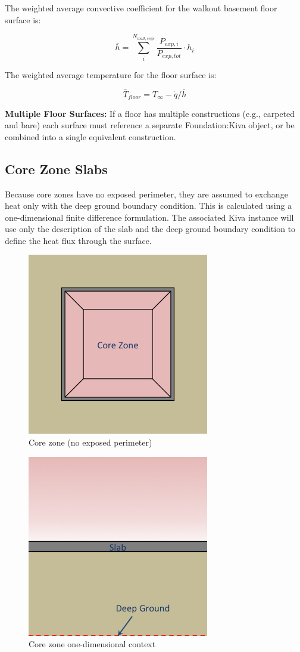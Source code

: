 The weighted average convective coefficient for the walkout basement
floor surface is:

\[\bar{h} = \sum^{N_{wall,segs}}_i{\frac{P_{exp,i}}{P_{exp,tot}}}\cdot h_i\]

The weighted average temperature for the floor surface is:

\[ \bar{T}_{floor} = T_\infty - \dot{q}/\bar{h} \]

\textbf{Multiple Floor Surfaces:} If a floor has multiple constructions
(e.g., carpeted and bare) each surface must reference a separate
Foundation:Kiva object, or be combined into a single equivalent
construction.

\subsection{Core Zone Slabs}

Because core zones have no exposed perimeter, they are assumed to
exchange heat only with the deep ground boundary condition. This is
calculated using a one-dimensional finite difference formulation. The
associated Kiva instance will use only the description of the slab and
the deep ground boundary condition to define the heat flux through the
surface.

\begin{figure}
\centering
\includegraphics{media/kiva-core-zone.png}
\caption{Core zone (no exposed perimeter)\label{fig:cz}}
\end{figure}

\begin{figure}
\centering
\includegraphics{media/kiva-core-zone-1d.png}
\caption{Core zone one-dimensional context\label{fig:cz-1}}
\end{figure}

